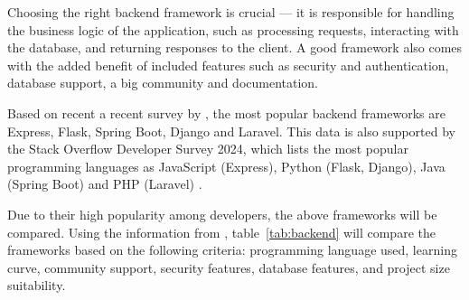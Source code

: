 Choosing the right backend framework is crucial --- it is responsible for handling the business logic of the application, such as processing requests, interacting with the database, and returning responses to the client. A good framework also comes with the added benefit of included features such as security and authentication, database support, a big community and documentation. 

Based on recent a recent survey by \textcite{statista-webframeworks}, the most popular backend frameworks are Express, Flask, Spring Boot, Django and Laravel. This data is also supported by the Stack Overflow Developer Survey 2024, which lists the most popular programming languages as JavaScript (Express), Python (Flask, Django), Java (Spring Boot) and PHP (Laravel) \parencite{stackoverflow}. 

Due to their high popularity among developers, the above frameworks will be compared. Using the information from \textcite{spring,express,django,fastapi}, table~\ref{tab:backend} will compare the frameworks based on the following criteria: programming language used, learning curve, community support, security features, database features, and project size suitability.

\begin{table}[h]
    \centering
    \caption{Comparison of backend frameworks}\label{tab:backend}
\end{table}

